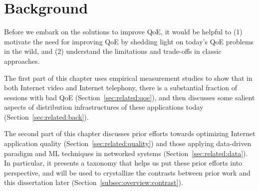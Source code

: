 \chapter{Background}
\label{ch:related}

%
%

Before we embark on the solutions to improve QoE, it would be helpful
to (1) motivate the need for improving QoE by shedding
light on today's QoE problems in the wild, and (2) understand the limitations and
trade-offs in classic approaches.

The first part of this chapter uses empirical measurement studies to 
show that in both Internet video 
and Internet telephony, there is a substantial fraction of sessions with bad QoE  
(Section~\ref{sec:related:qoe}), and then discusses 
some salient aspects of distribution infrastructures of these
applications today (Section~\ref{sec:related:back}).

The second part of this chapter discusses 
prior efforts towards optimizing Internet 
application quality 
(Section~\ref{sec:related:quality}) and those 
applying data-driven 
paradigm and ML techniques in networked 
systems (Section~\ref{sec:related:data}). 
In particular, it presents a taxonomy that helps us put 
these prior efforts into perspective, and
will be used to crystallize the contrasts between
prior work and this dissertation later (Section~\ref{subsec:overview:contrast}).

